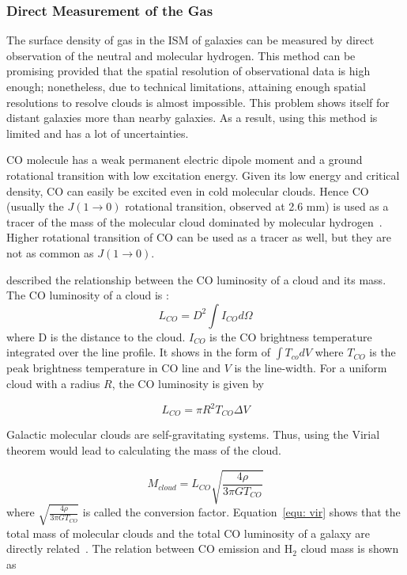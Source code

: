 \subsubsection{Direct Measurement of the Gas}

The surface density of gas in the ISM of galaxies can be measured by direct observation of the neutral and molecular hydrogen.
This method can be promising provided that the spatial resolution of observational data is high enough; nonetheless, due to technical limitations, attaining enough spatial resolutions to resolve clouds is almost impossible. This problem shows itself for distant galaxies more than nearby galaxies. 
As a result, using this method is limited and has a lot of uncertainties. 
 

CO molecule has a weak permanent electric dipole moment and a ground rotational transition with low excitation energy. 
Given its low energy and critical density, CO can easily be excited even in cold molecular clouds.
Hence CO (usually the $J(1\rightarrow 0)$ rotational transition, observed at 2.6 mm) is used as a tracer of the mass of the molecular cloud dominated by molecular hydrogen~\citep[e.g.][] {Sanders84}.
Higher rotational transition of CO can be used as a tracer as well, but they are not as common as $J(1\rightarrow 0)$.

\cite{Young91} described the relationship between the CO luminosity of a cloud and its mass. The CO luminosity of a cloud is :
\begin{equation}
L_{CO} = D^2 \int I_{CO} d\Omega 
\end{equation}
where D is the distance to the cloud. 
$I_{CO}$ is the CO brightness temperature integrated over the line profile.
It shows in the form of ${\int T_{co} dV}$ where $T_{CO}$ is the peak brightness temperature in CO line and $V$ is the line-width. 
For a uniform cloud with a radius $R$, the CO luminosity is given by

 \begin{equation}
L_{CO} = \pi R^2 T_{CO} \Delta V
\end{equation}

Galactic molecular clouds are self-gravitating systems.
Thus, using the Virial theorem would lead to calculating the mass of the cloud.

 \begin{equation}
 \label{equ: vir}
 M_{cloud} = L_{CO} \sqrt{\frac{4\rho}{3\pi G T_{CO}}}
 \end{equation}
 where $\sqrt{\frac{4\rho}{3\pi G T_{CO}}}$ is called the conversion factor. 
 Equation~\ref{equ: vir} shows that the total mass of molecular clouds and the total CO luminosity of a galaxy are directly related~\citep{Young91}. 
 The relation between CO emission and H$_2$ cloud mass is shown as

